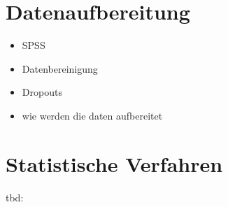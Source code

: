 \section{Datenaufbereitung}\label{section.datenaufbereitung}
\begin{itemize}
    \item SPSS
    \item Datenbereinigung
    \item Dropouts
    \item wie werden die daten aufbereitet
\end{itemize}


\section{Statistische Verfahren}\label{section.statistischeVerfahren}
tbd:






